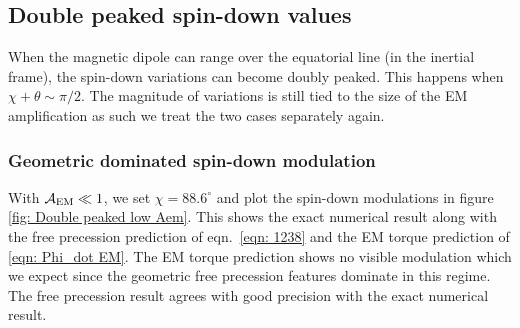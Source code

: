 \documentclass[/home/greg/Thesis/main/main.tex]{subfiles}
\begin{document}


\FloatBarrier
\subsection{Double peaked spin-down values}
When the magnetic dipole can range over the equatorial line (in the inertial
frame), the spin-down variations can become doubly peaked. This happens
when $\chi + \theta \sim \pi/2$. The magnitude of
variations is still tied to the size of the EM amplification as such we 
treat the two cases separately again.

\subsubsection{Geometric dominated spin-down modulation}
With $\mathcal{A}_{\mathrm{EM}} \ll 1$, we set $\chi=88.6^{\circ}$ and plot the spin-down modulations
in figure \ref{fig: Double peaked low Aem}. This shows the exact numerical 
result along with the free precession prediction of eqn.~\eqref{eqn: 1238} and
the EM torque prediction of \eqref{eqn: Phi_dot EM}. The EM torque 
prediction shows no visible modulation which we expect since the geometric 
free precession features dominate in this regime. The free precession result
agrees with good precision with the exact numerical result.
\end{document}
